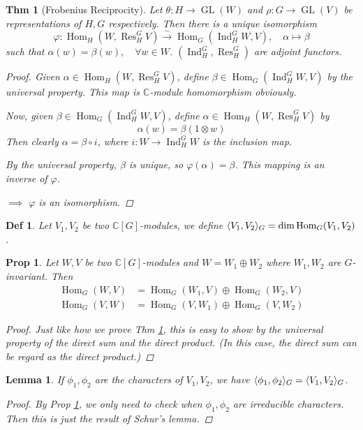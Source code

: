 \documentclass[a4paper]{article}
\DeclarePairedDelimiter{\inpd}{\langle}{\rangle} %
\newcommand*{\Cb}{\mathbb{C}}
\DeclareMathOperator{\Res}{Res}
\DeclareMathOperator{\Ind}{Ind}
\newcommand*\GL[1]{\operatorname{GL}\mathopen{}\left({#1}\right)\mathclose{}}
\DeclareMathOperator{\Hom}{Hom}
\newcommand*\isoto{\xrightarrow{\sim}}
\theoremstyle{mystyle}
\newtheorem{theorem}{Thm}
\newtheorem{lemma}{Lemma}
\newtheorem{definition}{Def}
\newtheorem{prop}{Prop}
\begin{document}
\begin{theorem}[Frobenius Reciprocity]
  \label{thm:frob}
  Let $\theta: H\to \GL{W}$ and $\rho: G\to \GL{V}$ be representations of
  $H, G$ respectively. Then there is a unique isomorphism
  \[
    \varphi: \Hom_H(W, \Res^G_H V) \isoto \Hom_G(\Ind^G_H W, V), \quad
    \alpha \mapsto \beta
  \]
  such that $\alpha(w) = \beta(w), \quad \forall w \in W$.
  $(\Ind^G_H, \Res^G_H)$ are adjoint functors.
  \begin{proof}
    Given $\alpha \in \Hom_H(W, \Res^G_H V)$, define
    $\beta \in \Hom_G(\Ind^G_H W, V)$ by the universal property.
    This map is $\Cb$-module homomorphism obviously.

    Now, given $\beta \in \Hom_G(\Ind^G_H W, V)$, define
    $\alpha \in \Hom_H(W, \Res^G_H V)$ by
    \[
      \alpha(w) = \beta(1\otimes w)
    \]
    Then clearly $\alpha = \beta \circ i$, where $i: W\to \Ind^G_H W$ is the
    inclusion map.

    By the universal property, $\beta$ is unique, so $\varphi(\alpha) = \beta$.
    This mapping is an inverse of $\varphi$.
    
    $\implies$ $\varphi$ is an isomorphism.
  \end{proof}
\end{theorem}

\begin{definition}
  Let $V_1, V_2$ be two $\Cb[G]$-modules, we define
  $\inpd{V_1, V_2}_G = \dim \Hom_G(V_1, V_2)$.
\end{definition}

\begin{prop}
  \label{prop:dimop}
  Let $W, V$ be two $\Cb[G]$-modules and $W = W_1\oplus W_2$ where
  $W_1, W_2$ are $G$-invariant. Then
  \begin{align*}
    \Hom_G(W, V) &= \Hom_G(W_1, V) \oplus \Hom_G(W_2, V) \\
    \Hom_G(V, W) &= \Hom_G(V, W_1) \oplus \Hom_G(V, W_2)
  \end{align*}
  \begin{proof}
    Just like how we prove Thm \ref{thm:frob},
    this is easy to show by the universal property of the direct sum
    and the direct product.
    (In this case, the direct sum can be regard as the direct product.)
  \end{proof}
\end{prop}

\begin{lemma}
  \label{lemma:inpd}
  If $\phi_1, \phi_2$ are the characters of $V_1, V_2$, we have
  $\inpd{\phi_1, \phi_2}_G = \inpd{V_1, V_2}_G$.
  \begin{proof}
    By Prop \ref{prop:dimop}, we only need to check when $\phi_1, \phi_2$
    are irreducible characters.
    Then this is just the result of Schur's lemma.
  \end{proof}
\end{lemma}
\end{document}
